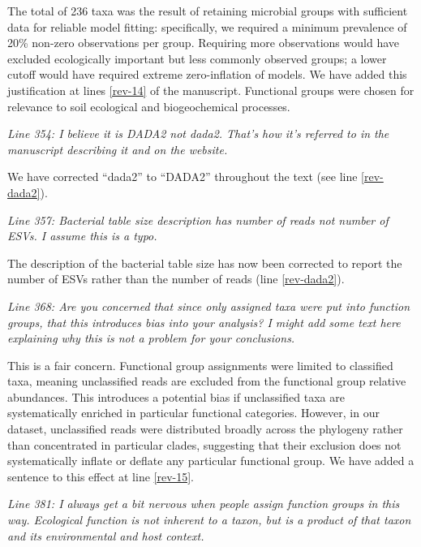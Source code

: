\documentclass[11pt]{article}
\begin{document}
The total of 236 taxa was the result of retaining microbial groups with sufficient data for reliable model fitting: specifically, we required a minimum prevalence of 20\% non-zero observations per group. Requiring more observations would have excluded ecologically important but less commonly observed groups; a lower cutoff would have required extreme zero-inflation of models. We have added this justification at lines \ref{rev-14} of the manuscript. Functional groups were chosen for relevance to soil ecological and biogeochemical processes.

\bigskip

\textit{Line 354: I believe it is DADA2 not dada2. That's how it's referred to in the manuscript describing it and on the website.}

We have corrected ``dada2'' to ``DADA2'' throughout the text (see line \ref{rev-dada2}).

\bigskip

\textit{Line 357: Bacterial table size description has number of reads not number of ESVs. I assume this is a typo.}

The description of the bacterial table size has now been corrected to report the number of ESVs rather than the number of reads (line \ref{rev-dada2}).

\bigskip

\textit{Line 368: Are you concerned that since only assigned taxa were put into function groups, that this introduces bias into your analysis? I might add some text here explaining why this is not a problem for your conclusions.}

This is a fair concern. Functional group assignments were limited to classified taxa, meaning unclassified reads are excluded from the functional group relative abundances. This introduces a potential bias if unclassified taxa are systematically enriched in particular functional categories. However, in our dataset, unclassified reads were distributed broadly across the phylogeny rather than concentrated in particular clades, suggesting that their exclusion does not systematically inflate or deflate any particular functional group. We have added a sentence to this effect at line \ref{rev-15}.

\bigskip

\textit{Line 381: I always get a bit nervous when people assign function groups in this way. Ecological function is not inherent to a taxon, but is a product of that taxon and its environmental and host context.}
\end{document}
